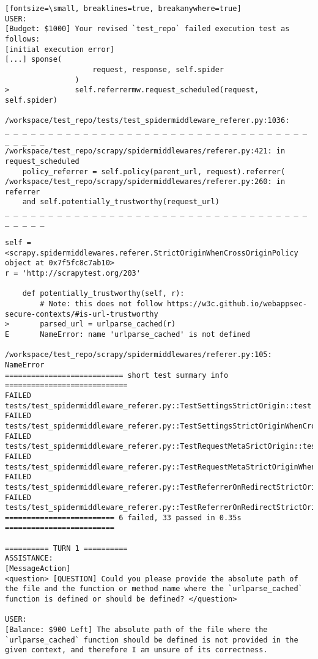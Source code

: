 \begin{verbatim}[fontsize=\small, breaklines=true, breakanywhere=true]
USER:
[Budget: $1000] Your revised `test_repo` failed execution test as follows:
[initial execution error]
[...] sponse(
                    request, response, self.spider
                )
>               self.referrermw.request_scheduled(request, self.spider)

/workspace/test_repo/tests/test_spidermiddleware_referer.py:1036: 
_ _ _ _ _ _ _ _ _ _ _ _ _ _ _ _ _ _ _ _ _ _ _ _ _ _ _ _ _ _ _ _ _ _ _ _ _ _ _ _ 
/workspace/test_repo/scrapy/spidermiddlewares/referer.py:421: in request_scheduled
    policy_referrer = self.policy(parent_url, request).referrer(
/workspace/test_repo/scrapy/spidermiddlewares/referer.py:260: in referrer
    and self.potentially_trustworthy(request_url)
_ _ _ _ _ _ _ _ _ _ _ _ _ _ _ _ _ _ _ _ _ _ _ _ _ _ _ _ _ _ _ _ _ _ _ _ _ _ _ _ 

self = <scrapy.spidermiddlewares.referer.StrictOriginWhenCrossOriginPolicy object at 0x7f5fc8c7ab10>
r = 'http://scrapytest.org/203'

    def potentially_trustworthy(self, r):
        # Note: this does not follow https://w3c.github.io/webappsec-secure-contexts/#is-url-trustworthy
>       parsed_url = urlparse_cached(r)
E       NameError: name 'urlparse_cached' is not defined

/workspace/test_repo/scrapy/spidermiddlewares/referer.py:105: NameError
=========================== short test summary info ============================
FAILED tests/test_spidermiddleware_referer.py::TestSettingsStrictOrigin::test
FAILED tests/test_spidermiddleware_referer.py::TestSettingsStrictOriginWhenCrossOrigin::test
FAILED tests/test_spidermiddleware_referer.py::TestRequestMetaSrictOrigin::test
FAILED tests/test_spidermiddleware_referer.py::TestRequestMetaStrictOriginWhenCrossOrigin::test
FAILED tests/test_spidermiddleware_referer.py::TestReferrerOnRedirectStrictOrigin::test
FAILED tests/test_spidermiddleware_referer.py::TestReferrerOnRedirectStrictOriginWhenCrossOrigin::test
========================= 6 failed, 33 passed in 0.35s =========================

========== TURN 1 ==========
ASSISTANCE:
[MessageAction]
<question> [QUESTION] Could you please provide the absolute path of the file and the function or method name where the `urlparse_cached` function is defined or should be defined? </question>

USER:
[Balance: $900 Left] The absolute path of the file where the `urlparse_cached` function should be defined is not provided in the given context, and therefore I am unsure of its correctness.


\end{verbatim}
